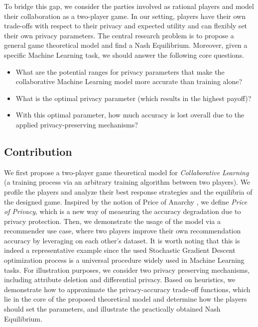 \documentclass[USenglish,oneside,twocolumn]{article}
\theoremstyle{plain}
\begin{document}
    To bridge this gap, we consider the parties involved as rational players and model their collaboration as a two-player game. In our setting, players have their own trade-offs with respect to their privacy and expected utility and can flexibly set their own privacy parameters. The central research problem is to propose a general game theoretical model and find a Nash Equilibrium. Moreover, given a specific Machine Learning task, we should answer the following core questions. 
    
    \begin{itemize}
        \item What are the potential ranges for privacy parameters that make the collaborative Machine Learning model more accurate than training alone?
        \item What is the optimal privacy parameter (which results in the highest payoff)?
        \item With this optimal parameter, how much accuracy is lost overall due to the applied privacy-preserving mechanisms?
    \end{itemize}
    \vspace{-0.0cm}
    
    \vspace{-0.5cm}
    \subsection{Contribution}
    \vspace{-0.25cm}
    
    We first propose a two-player game theoretical model for \textit{Collaborative Learning} (a training process via an arbitrary training algorithm between two players). We profile the players and analyze their best response strategies and the equilibria of the designed game. Inspired by the notion of Price of Anarchy \cite{koutsoupias1999worst}, we define \textit{Price of Privacy}, which is a new way of measuring the accuracy degradation due to privacy protection. Then, we demonstrate the usage of the model via a recommender use case, where two players improve their own recommendation accuracy by leveraging on each other's dataset. It is worth noting that this is indeed a representative example since the used Stochastic Gradient Descent optimization process is a universal procedure widely used in Machine Learning tasks. For illustration purposes, we consider two privacy preserving mechanisms, including attribute deletion and differential privacy. Based on heuristics, we demonstrate how to approximate the privacy-accuracy trade-off functions, which lie in the core of the proposed theoretical model and determine how the players should set the parameters, and illustrate the practically obtained Nash Equilibrium. 
    
\end{document}
